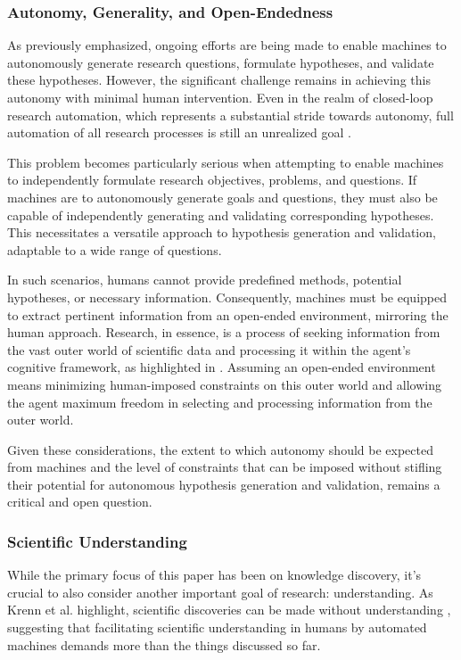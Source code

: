 \documentclass{article}
\begin{document}
\subsubsection{Autonomy, Generality, and Open-Endedness}

As previously emphasized, ongoing efforts are being made to enable machines to autonomously generate research questions, formulate hypotheses, and validate these hypotheses. However, the significant challenge remains in achieving this autonomy with minimal human intervention. Even in the realm of closed-loop research automation, which represents a substantial stride towards autonomy, full automation of all research processes is still an unrealized goal \cite{zenil2023,coley2020autonomous,coley2020autonomousII}.

This problem becomes particularly serious when attempting to enable machines to independently formulate research objectives, problems, and questions. If machines are to autonomously generate goals and questions, they must also be capable of independently generating and validating corresponding hypotheses. This necessitates a versatile approach to hypothesis generation and validation, adaptable to a wide range of questions.

In such scenarios, humans cannot provide predefined methods, potential hypotheses, or necessary information. Consequently, machines must be equipped to extract pertinent information from an open-ended environment, mirroring the human approach. Research, in essence, is a process of seeking information from the vast outer world of scientific data and processing it within the agent's cognitive framework, as highlighted in \cite{hope2022computational}. Assuming an open-ended environment means minimizing human-imposed constraints on this outer world and allowing the agent maximum freedom in selecting and processing information from the outer world.

Given these considerations, the extent to which autonomy should be expected from machines and the level of constraints that can be imposed without stifling their potential for autonomous hypothesis generation and validation, remains a critical and open question.

\subsubsection{Scientific Understanding}
While the primary focus of this paper has been on knowledge discovery, it's crucial to also consider another important goal of research: understanding. As Krenn et al. highlight, scientific discoveries can be made without understanding \cite{krenn2022scientific}, suggesting that facilitating scientific understanding in humans by automated machines demands more than the things discussed so far.
\end{document}
